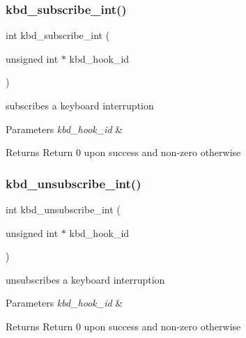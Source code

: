 \subsubsection{\texorpdfstring{kbd\+\_\+subscribe\+\_\+int()}{kbd\_subscribe\_int()}}
{\footnotesize\ttfamily int kbd\+\_\+subscribe\+\_\+int (\begin{DoxyParamCaption}\item[{unsigned int $\ast$}]{kbd\+\_\+hook\+\_\+id }\end{DoxyParamCaption})}



subscribes a keyboard interruption 


\begin{DoxyParams}{Parameters}
{\em kbd\+\_\+hook\+\_\+id} & \\
\hline
\end{DoxyParams}
\begin{DoxyReturn}{Returns}
Return 0 upon success and non-\/zero otherwise 
\end{DoxyReturn}
\hypertarget{group__kbc_ga32ab97f6b806fa3a0524e62af55aeb0e}{}\label{group__kbc_ga32ab97f6b806fa3a0524e62af55aeb0e} 
\subsubsection{\texorpdfstring{kbd\+\_\+unsubscribe\+\_\+int()}{kbd\_unsubscribe\_int()}}
{\footnotesize\ttfamily int kbd\+\_\+unsubscribe\+\_\+int (\begin{DoxyParamCaption}\item[{unsigned int $\ast$}]{kbd\+\_\+hook\+\_\+id }\end{DoxyParamCaption})}



unsubscribes a keyboard interruption 


\begin{DoxyParams}{Parameters}
{\em kbd\+\_\+hook\+\_\+id} & \\
\hline
\end{DoxyParams}
\begin{DoxyReturn}{Returns}
Return 0 upon success and non-\/zero otherwise 
\end{DoxyReturn}

